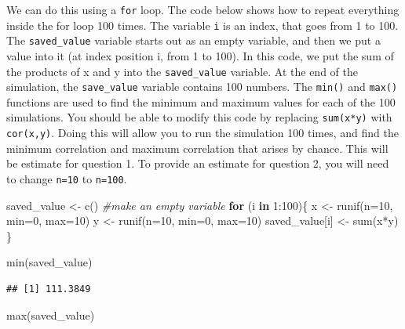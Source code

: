 \documentclass[
]{book}
\newenvironment{Shaded}{\begin{snugshade}}{\end{snugshade}}
\newcommand{\AttributeTok}[1]{\textcolor[rgb]{0.77,0.63,0.00}{#1}}
\newcommand{\CommentTok}[1]{\textcolor[rgb]{0.56,0.35,0.01}{\textit{#1}}}
\newcommand{\ControlFlowTok}[1]{\textcolor[rgb]{0.13,0.29,0.53}{\textbf{#1}}}
\newcommand{\DecValTok}[1]{\textcolor[rgb]{0.00,0.00,0.81}{#1}}
\newcommand{\FunctionTok}[1]{\textcolor[rgb]{0.00,0.00,0.00}{#1}}
\newcommand{\NormalTok}[1]{#1}
\newcommand{\OtherTok}[1]{\textcolor[rgb]{0.56,0.35,0.01}{#1}}
\newcommand{\SpecialCharTok}[1]{\textcolor[rgb]{0.00,0.00,0.00}{#1}}
\begin{document}
We can do this using a \texttt{for} loop. The code below shows how to repeat everything inside the for loop 100 times. The variable \texttt{i} is an index, that goes from 1 to 100. The \texttt{saved\_value} variable starts out as an empty variable, and then we put a value into it (at index position i, from 1 to 100). In this code, we put the sum of the products of x and y into the \texttt{saved\_value} variable. At the end of the simulation, the \texttt{save\_value} variable contains 100 numbers. The \texttt{min()} and \texttt{max()} functions are used to find the minimum and maximum values for each of the 100 simulations. You should be able to modify this code by replacing \texttt{sum(x*y)} with \texttt{cor(x,y)}. Doing this will allow you to run the simulation 100 times, and find the minimum correlation and maximum correlation that arises by chance. This will be estimate for question 1. To provide an estimate for question 2, you will need to change \texttt{n=10} to \texttt{n=100}.

\begin{Shaded}
\begin{Highlighting}[]
\NormalTok{saved\_value }\OtherTok{\textless{}{-}} \FunctionTok{c}\NormalTok{() }\CommentTok{\#make an empty variable}
\ControlFlowTok{for}\NormalTok{ (i }\ControlFlowTok{in} \DecValTok{1}\SpecialCharTok{:}\DecValTok{100}\NormalTok{)\{}
\NormalTok{  x }\OtherTok{\textless{}{-}} \FunctionTok{runif}\NormalTok{(}\AttributeTok{n=}\DecValTok{10}\NormalTok{, }\AttributeTok{min=}\DecValTok{0}\NormalTok{, }\AttributeTok{max=}\DecValTok{10}\NormalTok{)}
\NormalTok{  y }\OtherTok{\textless{}{-}} \FunctionTok{runif}\NormalTok{(}\AttributeTok{n=}\DecValTok{10}\NormalTok{, }\AttributeTok{min=}\DecValTok{0}\NormalTok{, }\AttributeTok{max=}\DecValTok{10}\NormalTok{)}
\NormalTok{  saved\_value[i] }\OtherTok{\textless{}{-}} \FunctionTok{sum}\NormalTok{(x}\SpecialCharTok{*}\NormalTok{y)}
\NormalTok{\}}

\FunctionTok{min}\NormalTok{(saved\_value)}
\end{Highlighting}
\end{Shaded}

\begin{verbatim}
## [1] 111.3849
\end{verbatim}

\begin{Shaded}
\begin{Highlighting}[]
\FunctionTok{max}\NormalTok{(saved\_value)}
\end{Highlighting}
\end{Shaded}
\end{document}
